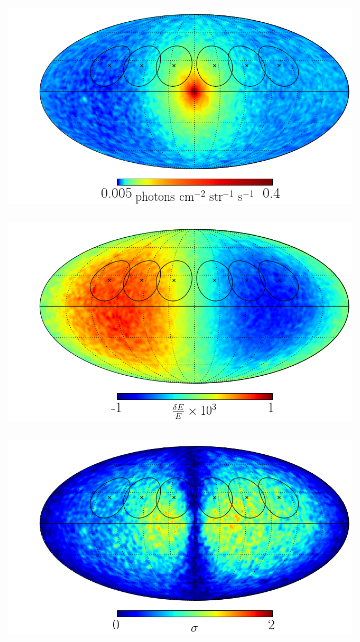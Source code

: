 \documentclass[aps,prd,10pt,twocolumn,superscriptaddress,showpacs]{revtex4-1}
\begin{document}
\begin{figure}[h!]
\centering
\begin{subfigure}[b]{1.0\columnwidth}
	\includegraphics[width=\textwidth]{flux_map_374.png}
\end{subfigure}
\par\medskip
\begin{subfigure}[b]{1.0\columnwidth}
	\includegraphics[width=\textwidth]{line_map_374.png}
\end{subfigure}
\par\medskip
\begin{subfigure}[b]{1.0\columnwidth}
	\includegraphics[width=\textwidth]{sigma_map_374.png}

\end{subfigure}
\end{figure}
\end{document}
